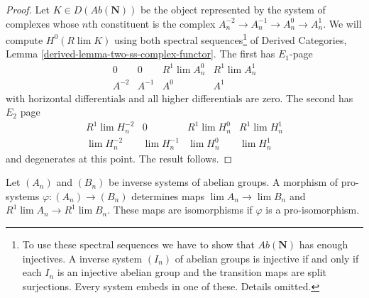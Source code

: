 \begin{proof}
Let $K \in D(\textit{Ab}(\mathbf{N}))$ be the object represented
by the system of complexes whose $n$th constituent
is the complex $A^{-2}_n \to A^{-1}_n \to A^0_n \to A^1_n$.
We will compute $H^0(R\lim K)$ using both spectral
sequences\footnote{To use these spectral sequences we have to
show that $\textit{Ab}(\mathbf{N})$ has enough injectives.
A inverse system $(I_n)$ of abelian groups is injective if and only
if each $I_n$ is an injective abelian group and the transition maps are
split surjections. Every system embeds in one of these. Details omitted.} of
Derived Categories, Lemma \ref{derived-lemma-two-ss-complex-functor}.
The first has $E_1$-page
$$
\begin{matrix}
0 & 0 & R^1\lim A^0_n  & R^1\lim A^1_n \\
A^{-2} & A^{-1} & A^0  & A^1
\end{matrix}
$$
with horizontal differentials and all higher differentials are zero.
The second has $E_2$ page
$$
\begin{matrix}
R^1\lim H^{-2}_n & 0 & R^1\lim H^0_n & R^1 \lim H^1_n \\
\lim H^{-2}_n &
\lim H^{-1}_n &
\lim H^0_n &
\lim H^1_n
\end{matrix}
$$
and degenerates at this point. The result follows.
\end{proof}

\begin{lemma}
\label{lemma-pro-isomorphism-iso-Rlim}
Let $(A_n)$ and $(B_n)$ be inverse systems of abelian groups.
A morphism of pro-systems $\varphi : (A_n) \to (B_n)$ determines
maps $\lim A_n \to \lim B_n$ and $R^1\lim A_n \to R^1\lim B_n$.
These maps are isomorphisms if $\varphi$ is a pro-isomorphism.
\end{lemma}

